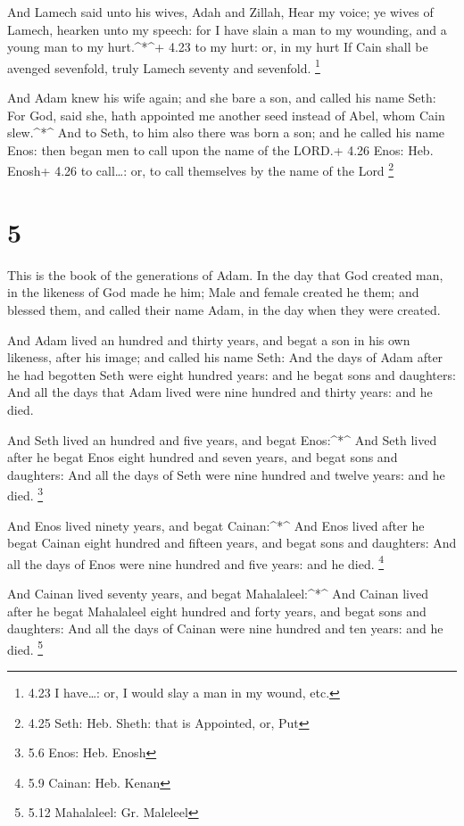  And Lamech said unto his wives, Adah and Zillah, Hear my
voice; ye wives of Lamech, hearken unto my speech: for I have slain a
man to my wounding, and a young man to my hurt.\^{}*\^{}+ 4.23 to my
hurt: or, in my hurt  If Cain shall be avenged sevenfold,
truly Lamech seventy and sevenfold. \footnote{4.23 I have\ldots: or, I
  would slay a man in my wound, etc.}

 And Adam knew his wife again; and she bare a son, and
called his name Seth: For God, said she, hath appointed me another seed
instead of Abel, whom Cain slew.\^{}*\^{}  And to Seth, to
him also there was born a son; and he called his name Enos: then began
men to call upon the name of the LORD.+ 4.26 Enos: Heb. Enosh+ 4.26 to
call\ldots: or, to call themselves by the name of the Lord \footnote{4.25
  Seth: Heb. Sheth: that is Appointed, or, Put}

\hypertarget{section-4}{%
\section{5}\label{section-4}}

 This is the book of the generations of Adam. In the day
that God created man, in the likeness of God made he him; 
Male and female created he them; and blessed them, and called their name
Adam, in the day when they were created.

 And Adam lived an hundred and thirty years, and begat a son
in his own likeness, after his image; and called his name Seth:
 And the days of Adam after he had begotten Seth were eight
hundred years: and he begat sons and daughters:  And all the
days that Adam lived were nine hundred and thirty years: and he died.

 And Seth lived an hundred and five years, and begat
Enos:\^{}*\^{}  And Seth lived after he begat Enos eight
hundred and seven years, and begat sons and daughters:  And
all the days of Seth were nine hundred and twelve years: and he died.
\footnote{5.6 Enos: Heb. Enosh}

 And Enos lived ninety years, and begat Cainan:\^{}*\^{}
 And Enos lived after he begat Cainan eight hundred and
fifteen years, and begat sons and daughters:  And all the
days of Enos were nine hundred and five years: and he died. \footnote{5.9
  Cainan: Heb. Kenan}

 And Cainan lived seventy years, and begat
Mahalaleel:\^{}*\^{}  And Cainan lived after he begat
Mahalaleel eight hundred and forty years, and begat sons and daughters:
 And all the days of Cainan were nine hundred and ten
years: and he died. \footnote{5.12 Mahalaleel: Gr. Maleleel}

